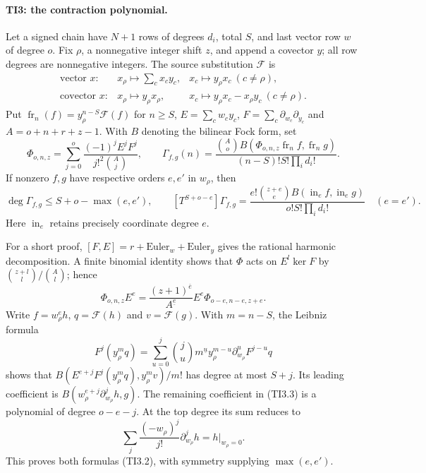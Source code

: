 \paragraph{TI3: the contraction polynomial.}
Let a signed chain have $N+1$ rows of degrees $d_i$, total $S$, and last
vector row $w$ of degree $o$. Fix $\rho$, a nonnegative integer shift $z$,
and append a covector $y$; all row degrees are nonnegative integers.
The source substitution $\mathcal F$ is
\[
\begin{array}{lll}
\text{vector }x:&x_\rho\mapsto\sum_cx_cy_c,&x_c\mapsto y_\rho x_c\ (c\ne\rho),\\
\text{covector }x:&x_\rho\mapsto y_\rho x_\rho,
 &x_c\mapsto y_\rho x_c-x_\rho y_c\ (c\ne\rho).
\end{array}
\]
Put $\operatorname{fr}_n(f)=y_\rho^{n-S}\mathcal F(f)$ for $n\geq S$,
$E=\sum_cw_cy_c$, $F=\sum_c\partial_{w_c}\partial_{y_c}$ and
$A=o+n+r+z-1$.  With $B$ denoting the bilinear Fock form, set
\[
 \Phi_{o,n,z}=\sum_{j=0}^o\frac{(-1)^jE^jF^j}{j!^2\binom Aj},\qquad
 \Gamma_{f,g}(n)=
 \frac{\binom Ao B(\Phi_{o,n,z}\operatorname{fr}_n f,
                         \operatorname{fr}_n g)}
 {(n-S)!S!\prod_i d_i!}.
 \tag{TI3.1}
\]
If nonzero $f,g$ have respective orders $e,e'$ in $w_\rho$, then
\[
 \deg\Gamma_{f,g}\leq S+o-\max(e,e'),\qquad
 [T^{S+o-e}]\Gamma_{f,g}
 =\frac{e!\binom{z+e}e B(\operatorname{in}_ef,\operatorname{in}_eg)}
 {o!S!\prod_i d_i!}\quad(e=e').
 \tag{TI3.2}
\]
Here $\operatorname{in}_e$ retains precisely coordinate degree $e$.

For a short proof, $[F,E]=r+\mathrm{Euler}_w+\mathrm{Euler}_y$ gives
the rational harmonic decomposition.  A finite binomial identity shows
that $\Phi$ acts on $E^l\ker F$ by $\binom{z+l}l/\binom Al$; hence
\[
 \Phi_{o,n,z}E^e=
 \frac{(z+1)^{\overline e}}{A^{\underline e}}
 E^e\Phi_{o-e,n-e,z+e}.
 \tag{TI3.3}
\]
Write $f=w_\rho^eh$, $q=\mathcal F(h)$ and $v=\mathcal F(g)$.
With $m=n-S$, the Leibniz formula
\[
 F^j(y_\rho^mq)=\sum_{u=0}^j\binom ju m^{\underline u}
 y_\rho^{m-u}\partial_{w_\rho}^uF^{j-u}q
\]
shows that $B(E^{e+j}F^j(y_\rho^mq),y_\rho^mv)/m!$ has degree at
most $S+j$.  Its leading coefficient is
$B(w_\rho^{e+j}\partial_{w_\rho}^jh,g)$.
The remaining coefficient in (TI3.3) is a polynomial of degree $o-e-j$.
At the top degree its sum reduces to
\[
 \sum_j\frac{(-w_\rho)^j}{j!}\partial_{w_\rho}^jh
 =h\big|_{w_\rho=0}.
\]
This proves both formulas (TI3.2), with symmetry supplying $\max(e,e')$.

